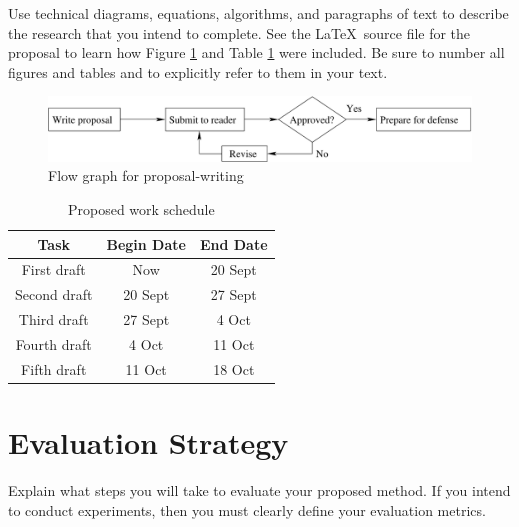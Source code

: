 \documentclass[11pt]{article}
\begin{document}

Use technical diagrams, equations, algorithms, and paragraphs of text
to describe the research that you intend to complete. See the \LaTeX\ source
file for the proposal to learn how Figure \ref{intro-fig1} and Table
\ref{intro-tab1} were included. Be sure to number all figures and tables and to
explicitly refer to them in your text.

\begin{figure}[htbp]
\centering
\includegraphics[width=5in]{flow}
\caption{Flow graph for proposal-writing}
\label{intro-fig1}
\end{figure}

\begin{table}[htbp]
\centering
\begin{tabular}{|c||c|c|}
\hline
\bf Task & \bf Begin Date & \bf End Date\\\hline\hline
First draft & Now & 20 Sept\\\hline
Second draft & 20 Sept & 27 Sept\\\hline
Third draft & 27 Sept & 4 Oct\\\hline
Fourth draft & 4 Oct & 11 Oct\\\hline
Fifth draft & 11 Oct & 18 Oct\\\hline
\end{tabular}
\caption{Proposed work schedule}
\label{intro-tab1}
\end{table}

\vspace*{-.2in}
\section{Evaluation Strategy}
\label{sec:evaluate}
\vspace*{-.1in}


Explain what steps you will take to evaluate your proposed method.  If
you intend to conduct experiments, then you must clearly define your
evaluation metrics.
\end{document}
